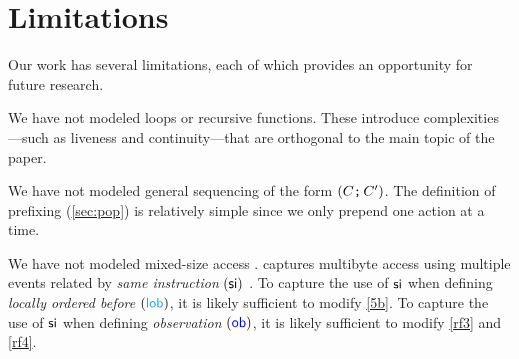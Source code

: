 

\section{Limitations}
\label{sec:limits}


 Our work has several limitations, each of which provides an opportunity for
future research.  %

We have not modeled loops or recursive functions.  These
introduce complexities\allowbreak{}---such as liveness and continuity---that
are orthogonal to the main topic of the paper.

We have not modeled general sequencing of the form $(C\texttt{;}\,\allowbreak C')$.  The
definition of prefixing (\textsection\ref{sec:pop}) is relatively simple
since we only prepend one action at a time.

We have not modeled mixed-size access
\cite{DBLP:conf/popl/FlurSPNMGSBS17,DBLP:conf/pldi/WattPPBDFPG20}.  
\armeight{} captures multibyte access using multiple events related by
\emph{same instruction} $(\mathrel{\mathsf{si}})$ \cite{alglave-git}. To capture the use of
$\mathrel{\mathsf{si}}$ when defining \emph{locally ordered before} $(\rlob)$, it is likely
sufficient to modify \ref{5b}.  To capture the use of $\mathrel{\mathsf{si}}$ when defining
\emph{observation} $(\mathrel{\textcolor{blue}{\mathsf{ob}}})$, it is likely sufficient to modify \ref{rf3} and
\ref{rf4}.

